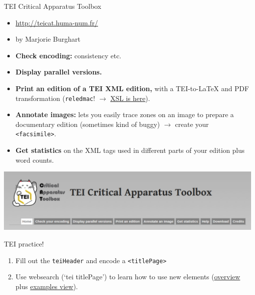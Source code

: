 
\begin{frame}{TEI Critical Apparatus Toolbox}

    \begin{itemize}\small 
        \item \protect\url{http://teicat.huma-num.fr/}
        \item by Marjorie Burghart
        \item \textbf{Check encoding:} consistency etc.
        \item \textbf{Display parallel versions.}
        \item \textbf{Print an edition of a TEI XML edition,} with a TEI-to-\LaTeX{} and PDF transformation (\texttt{reledmac}! $\to$ \href{https://github.com/MarjorieBurghart/TEI-CAT/blob/master/tei2latex_final.xslt}{XSL is here}).
        \item \textbf{Annotate images:} lets you easily trace zones on an image to prepare a documentary edition (sometimes kind of buggy) $\to$ create your \texttt{<facsimile>}.
        \item \textbf{Get statistics} on the XML tags used in different parts of your edition plus word counts.
    \end{itemize}
    
    \includegraphics[width=\textwidth]{img/tei-critical-app-toolbox.png}
\end{frame}



\begin{frame}[standout]
    \alert{TEI practice!} \\
    \begin{enumerate}\small
        \item Fill out the \texttt{teiHeader} and encode a \texttt{<titlePage>}
        \item Use websearch (`tei titlePage') to learn how to use new elements (\href{https://tei-c.org/release/doc/tei-p5-doc/en/html/ref-msDesc.html}{overview} plus \href{https://tei-c.org/release/doc/tei-p5-doc/en/html/examples-msDesc.html}{examples view}).
    \end{enumerate} 
\end{frame}



